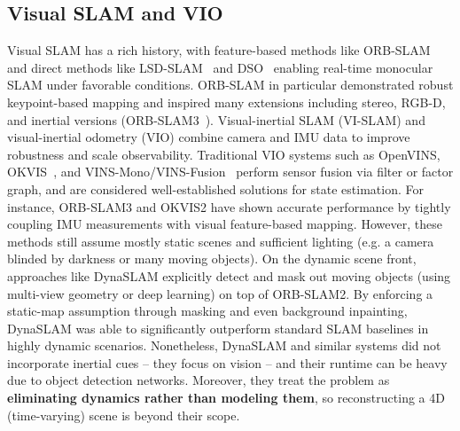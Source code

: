 \subsection{Visual SLAM and VIO}
Visual SLAM has a rich history, with feature-based methods like ORB-SLAM~\cite{mur2015orb} and direct methods like LSD-SLAM~\cite{engel2014lsd} and DSO~\cite{engel2017direct} enabling real-time monocular SLAM under favorable conditions. ORB-SLAM in particular demonstrated robust keypoint-based mapping and inspired many extensions including stereo, RGB-D, and inertial versions (ORB-SLAM3~\cite{orbslam3}). Visual-inertial SLAM (VI-SLAM) and visual-inertial odometry (VIO) combine camera and IMU data to improve robustness and scale observability. Traditional VIO systems such as OpenVINS\cite{openvins}, OKVIS~\cite{leutenegger2022okvis2}, and VINS-Mono/VINS-Fusion~\cite{vins-mono,qin2019general} perform sensor fusion via filter or factor graph, and are considered well-established solutions for state estimation. For instance, ORB-SLAM3 and OKVIS2 have shown accurate performance by tightly coupling IMU measurements with visual feature-based mapping. However, these methods still assume mostly static scenes and sufficient lighting (e.g. a camera blinded by darkness or many moving objects). On the dynamic scene front, approaches like DynaSLAM\cite{bescos2018dynaslam} explicitly detect and mask out moving objects (using multi-view geometry or deep learning) on top of ORB-SLAM2. By enforcing a static-map assumption through masking and even background inpainting, DynaSLAM was able to significantly outperform standard SLAM baselines in highly dynamic scenarios. Nonetheless, DynaSLAM and similar systems did not incorporate inertial cues – they focus on vision – and their runtime can be heavy due to object detection networks. Moreover, they treat the problem as \textbf{eliminating dynamics rather than modeling them}, so reconstructing a 4D (time-varying) scene is beyond their scope.



